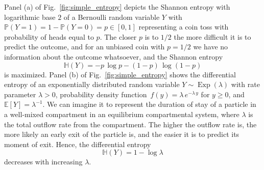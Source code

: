 \documentclass[smallextended]{svjour3}
\renewcommand{\P}{\mathbb{P}}
\newcommand{\E}{\mathbb{E}}
\renewcommand{\H}{\mathbb{H}}
\newcommand{\Exp}{\operatorname{Exp}}
\newcommand{\pdf}{probability density function}
\begin{document}
Panel (a) of Fig.~\ref{fig:simple_entropy} depicts the Shannon entropy with logarithmic base $2$ of a Bernoulli random variable $Y$ with $\P(Y=1)=1-\P(Y=0)=p\in[0,1]$ representing a coin toss with probability of heads equal to $p$.
The closer $p$ is to $1/2$ the more difficult it is to predict the outcome, and for an unbiased coin with $p=1/2$ we have no information about the outcome whatsoever, and the Shannon entropy
\begin{equation}
	\H(Y) = -p\,\log p - (1-p)\,\log(1-p)
\end{equation}
is maximized.
Panel (b) of Fig.~\ref{fig:simple_entropy} shows the differential entropy of an exponentially distributed random variable $Y\sim\Exp(\lambda)$ with rate parameter $\lambda>0$, \pdf\ $f(y) = \lambda\,e^{-\lambda\,y}$ for $y\geq0$, and $\E\left[Y\right]=\lambda^{-1}$.
We can imagine it to represent the duration of stay of a particle in a well-mixed compartment in an equilibrium compartmental system, where $\lambda$ is the total outflow rate from the compartment.
The higher the outflow rate is, the more likely an early exit of the particle is, and the easier it is to predict its moment of exit.
Hence, the differential entropy 
\begin{equation}
	\H(Y) = 1-\log\lambda
\end{equation}
decreases with increasing $\lambda$.
\end{document}
